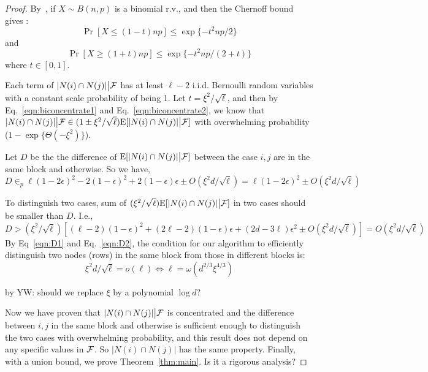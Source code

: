 \begin{proof}
By~\cite{mitzenmacher2005probability}, if $X \sim B(n,p)$ is a binomial r.v., and then the Chernoff bound gives :
\begin{equation} \label{eqn:biconcentrate1}
    \Pr[X \leq (1-t)n p] \leq \exp \{ -t^2 n p/2 \}
\end{equation}
and 
\begin{equation} \label{eqn:biconcentrate2}
    \Pr[X \geq (1+t)n p] \leq \exp \{ -t^2 n p/ (2+ t) \}
\end{equation}
where $t \in [0,1]$.

Each term of $|N(i) \cap N(j)| \big|\mathcal{F}$ has at least $\ell-2$ i.i.d. Bernoulli random variables with a constant scale probability of being 1. Let $t= \xi^2/\sqrt{\ell}$, and then by Eq.~\ref{eqn:biconcentrate1} and Eq.~\ref{eqn:biconcentrate2}, we know that $|N(i) \cap N(j)|\big|\mathcal{F} \in (1 \pm \xi^2/\sqrt{\ell}) \mathrm{E}[|N(i) \cap N(j)| \big| \mathcal{F}]$ with overwhelming probability ($1-\exp\{ \Theta(-\xi^2) \}$).


Let $D$ be the the difference of $\mathrm{E}[|N(i) \cap N(j)| \big| \mathcal{F}]$ between the case $i,j$ are in the same block and otherwise. So we have, 
\begin{equation}\label{eqn:D1}
    D \in_p \ell(1-2\epsilon)^2 - 2(1-\epsilon)^2 + 2(1-\epsilon)\epsilon \pm O(\xi^2d/\sqrt{\ell}) = \ell(1-2\epsilon)^2 \pm O(\xi^2d/\sqrt{\ell})
\end{equation}

To distinguish two cases, sum of $(\xi^2/\sqrt{\ell}) \mathrm{E}[|N(i) \cap N(j)| \big| \mathcal{F}]$ in two cases should be smaller than $D$. I.e.,
\begin{equation}\label{eqn:D2}
    D > (\xi^2/\sqrt{\ell})\left[ (\ell-2)(1-\epsilon)^2 + (2\ell-2)(1 -\epsilon)\epsilon + (2d - 3\ell)\epsilon^2 \pm O(\xi^2 d/\sqrt{\ell}) \right] = O(\xi^2d/\sqrt{\ell})
\end{equation}
By Eq~\ref{eqn:D1} and Eq.~\ref{eqn:D2}, the condition for our algorithm to efficiently distinguish two nodes (rows) in the same block from those in different blocks is:
\begin{equation}
   \xi^2 d/\sqrt{\ell} = o(\ell) \Leftrightarrow \ell = \omega (d^{2/3}\xi^{4/3})
\end{equation}

{\color{red}by YW: should we replace $\xi$ by a polynomial $\log d$?}

Now we have proven that $|N(i) \cap N(j)| \big| \mathcal{F}$ is concentrated and the difference between $i,j$ in the same block and otherwise is sufficient enough to distinguish the two cases with overwhelming probability, and this result does not depend on any specific values in $\mathcal{F}$. So $|N(i) \cap N(j)|$ has the same property. Finally, with a union bound, we prove Theorem~\ref{thm:main}. 
{\color{red}Is it a rigorous analysis?}
\end{proof}

